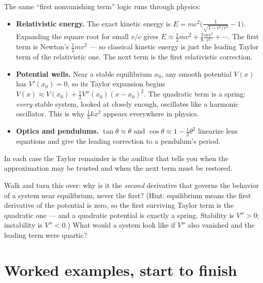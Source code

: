 \begin{applicationbox}
The same ``first nonvanishing term'' logic runs through physics:
\begin{itemize}
\item \textbf{Relativistic energy.} The exact kinetic energy is
$E = mc^2\big(\tfrac{1}{\sqrt{1-v^2/c^2}} - 1\big)$. Expanding the square root for
small $v/c$ gives $E \approx \tfrac12 mv^2 + \tfrac{3}{8}\frac{mv^4}{c^2} + \cdots$.
The first term is Newton's $\tfrac12 mv^2$ --- so classical kinetic energy is just the
leading Taylor term of the relativistic one. The next term is the first relativistic
correction.
\item \textbf{Potential wells.} Near a stable equilibrium $x_0$, any smooth potential
$V(x)$ has $V'(x_0)=0$, so its Taylor expansion begins
$V(x) \approx V(x_0) + \tfrac12 V''(x_0)(x-x_0)^2$. The quadratic term is a spring:
\emph{every} stable system, looked at closely enough, oscillates like a harmonic
oscillator. This is why $\tfrac12 k x^2$ appears everywhere in physics.
\item \textbf{Optics and pendulums.} $\tan\theta \approx \theta$ and
$\cos\theta \approx 1 - \tfrac12\theta^2$ linearize lens equations and give the
leading correction to a pendulum's period.
\end{itemize}
In each case the Taylor remainder is the auditor that tells you when the
approximation may be trusted and when the next term must be restored.
\end{applicationbox}

\begin{walkbox}
Walk and turn this over: why is it the \emph{second} derivative that governs the
behavior of a system near equilibrium, never the first? (Hint: equilibrium means the
first derivative of the potential is zero, so the first surviving Taylor term is the
quadratic one --- and a quadratic potential is exactly a spring. Stability is
$V''>0$; instability is $V''<0$.) What would a system look like if $V''$ also
vanished and the leading term were quartic?
\end{walkbox}

\section{Worked examples, start to finish}


